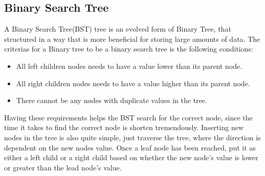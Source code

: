 \subsection{Binary Search Tree}
A Binary Search Tree(BST) tree is an evolved form of Binary Tree, that structured in a way that is more beneficial for storing large amounts of data. The criterias for a Binary tree to be a binary search tree is the following conditions:
\begin{itemize}
	\item{All left children nodes needs to have a value lower than its parent node.}
	\item{All right children nodes needs to have a value higher than its parent node.}
	\item{There cannot be any nodes with duplicate values in the tree.}
\end{itemize}
Having these requirements helps the BST search for the correct node, since the time it takes to find the correct node is shorten tremendously. Inserting new nodes in the tree is also quite simple, just traverse the tree, where the direction is dependent on the new nodes value. Once a leaf node has been reached, put it as either a left child or a right child based on whether the new node's value is lower or greater than the lead node's value.\cite{BinaryTree,BST}